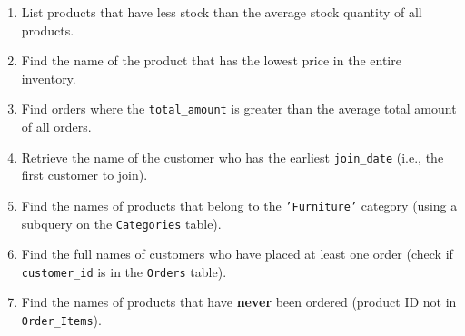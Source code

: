 \documentclass[12pt,a4paper]{article}
\begin{document}
\begin{enumerate}
    \item List products that have less stock than the average stock quantity of all products.

    \item Find the name of the product that has the lowest price in the entire inventory.

    \item Find orders where the \texttt{total\_amount} is greater than the average total amount of all orders.

    \item Retrieve the name of the customer who has the earliest \texttt{join\_date} (i.e., the first customer to join).


    \item Find the names of products that belong to the \texttt{'Furniture'} category (using a subquery on the \texttt{Categories} table).

    \item Find the full names of customers who have placed at least one order (check if \texttt{customer\_id} is in the \texttt{Orders} table).

    \item Find the names of products that have \textbf{never} been ordered (product ID not in \texttt{Order\_Items}).


\end{enumerate}
\end{document}
